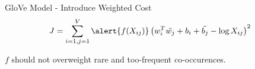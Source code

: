 \begin{frame}{GloVe Model - Introduce Weighted Cost}
  \begin{align*}
    & J = \sum_{i=1,j=1}^V \alert{f(X_{ij})} \left( w_i^T\tilde{w_j} +b_i + \tilde{b_j} - \log X_{ij} \right)^2
  \end{align*}
  \begin{center}
    $f$ should not overweight rare and too-frequent co-occurences.
  \end{center}
\end{frame}


